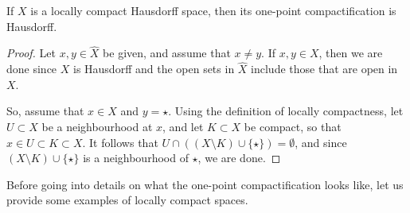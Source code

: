 \begin{prop}
  If $X$ is a locally compact Hausdorff space, then its one-point compactification is Hausdorff.
\end{prop}
\begin{proof}
  Let $x,y \in \hat{X}$ be given, and assume that $x \not= y$. If $x,y \in X$, then we are done since $X$ is Hausdorff and the open sets in $\hat{X}$ include those that are open in $X$.
  
  So, assume that $x \in X$ and $y = \star$. Using the definition of locally compactness, let $U \subset X$ be a  neighbourhood at $x$, and let $K \subset X$ be compact, so that $x \in U \subset K \subset X$. It follows that $U \cap ((X \setminus K) \cup \{\star\}) = \emptyset$, and since $(X \setminus K) \cup \{\star\}$ is a neighbourhood of $\star$, we are done.
\end{proof}

Before going into details on what the one-point compactification looks like, let us provide some examples of locally compact spaces.

